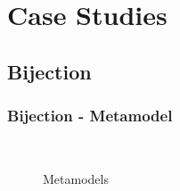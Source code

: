 \documentclass{beamer}
\begin{document}

\section{Case Studies}

\subsection{Bijection}

\begin{frame}
\frametitle{\textbf{Bijection} - \textbf{Metamodel}}

\begin{figure}[ht]
    \centering
    \mbox{\qquad\qquad
          }
    \caption{Metamodels}
    \label{fig:Meta}
\end{figure}

\end{frame}
\end{document}
